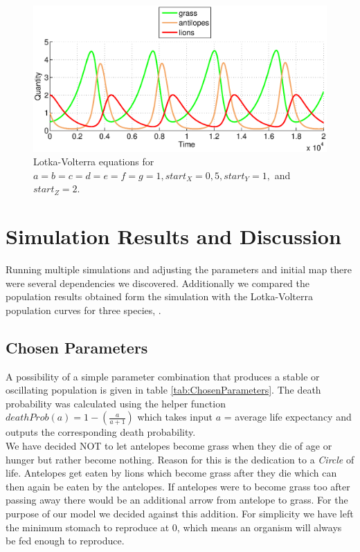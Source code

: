 \documentclass[11pt]{article}
\begin{document}
\begin{figure}
\centering
\includegraphics[scale=0.65]{LotkaVolterraThreeAllOnes}
\caption{Lotka-Volterra equations for $a=b=c=d=e=f=g=1,start_X=0,5, start_Y=1,$ and $start_Z=2$.}
\label{fig:LotkaVolterraThreeAllOnes}
\end{figure}

\section{Simulation Results and Discussion}
Running multiple simulations and adjusting the parameters and initial map there were several dependencies we discovered. Additionally we compared the population results obtained form the simulation with the Lotka-Volterra population curves for three species, \cite{lotkaVolterraThreeSpecies}. 

\subsection{Chosen Parameters}
A possibility of a simple parameter combination that produces a stable or oscillating population is given in table \ref{tab:ChosenParameters}.
The death probability was calculated using the helper function $deathProb(a) = 1-(\frac{a}{a+1})$ which takes input $a$ = average life expectancy and outputs the corresponding death probability.\\
We have decided NOT to let antelopes become grass when they die of age or hunger but rather become nothing. Reason for this is the dedication to a {\it Circle} of life. Antelopes get eaten by lions which become grass after they die which can then again be eaten by the antelopes. If antelopes were to become grass too after passing away there would be an additional arrow from antelope to grass. For the purpose of our model we decided against this addition. For simplicity we have left the minimum stomach to reproduce at 0, which means an organism will always be fed enough to reproduce.
\end{document}

